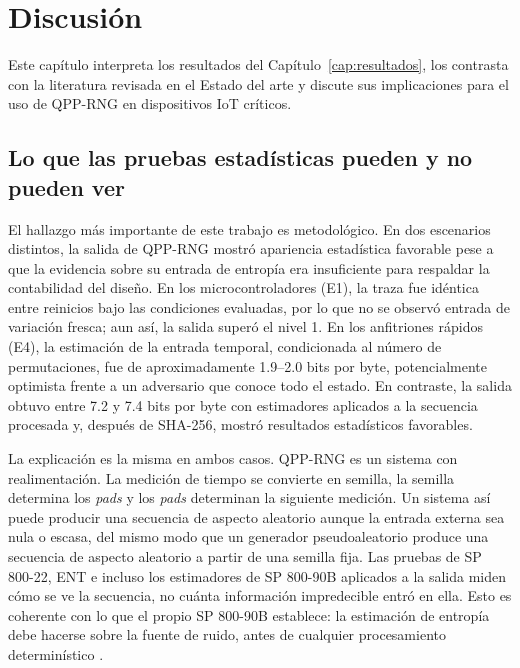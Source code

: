\chapter{Discusión}
\label{cap:discusion}

Este capítulo interpreta los resultados del Capítulo~\ref{cap:resultados}, los contrasta con la literatura revisada en el Estado del arte y discute sus implicaciones para el uso de QPP-RNG en dispositivos IoT críticos.

\section{Lo que las pruebas estadísticas pueden y no pueden ver}

El hallazgo más importante de este trabajo es metodológico. En dos escenarios distintos, la salida de QPP-RNG mostró apariencia estadística favorable pese a que la evidencia sobre su entrada de entropía era insuficiente para respaldar la contabilidad del diseño. En los microcontroladores (E1), la traza fue idéntica entre reinicios bajo las condiciones evaluadas, por lo que no se observó entrada de variación fresca; aun así, la salida superó el nivel 1. En los anfitriones rápidos (E4), la estimación de la entrada temporal, condicionada al número de permutaciones, fue de aproximadamente 1.9--2.0 bits por byte, potencialmente optimista frente a un adversario que conoce todo el estado. En contraste, la salida obtuvo entre 7.2 y 7.4 bits por byte con estimadores aplicados a la secuencia procesada y, después de SHA-256, mostró resultados estadísticos favorables.

La explicación es la misma en ambos casos. QPP-RNG es un sistema con realimentación. La medición de tiempo se convierte en semilla, la semilla determina los \textit{pads} y los \textit{pads} determinan la siguiente medición. Un sistema así puede producir una secuencia de aspecto aleatorio aunque la entrada externa sea nula o escasa, del mismo modo que un generador pseudoaleatorio produce una secuencia de aspecto aleatorio a partir de una semilla fija. Las pruebas de SP 800-22, ENT e incluso los estimadores de SP 800-90B aplicados a la salida miden cómo se ve la secuencia, no cuánta información impredecible entró en ella. Esto es coherente con lo que el propio SP 800-90B establece: la estimación de entropía debe hacerse sobre la fuente de ruido, antes de cualquier procesamiento determinístico \cite{Turan2018RecommendationGeneration}.

